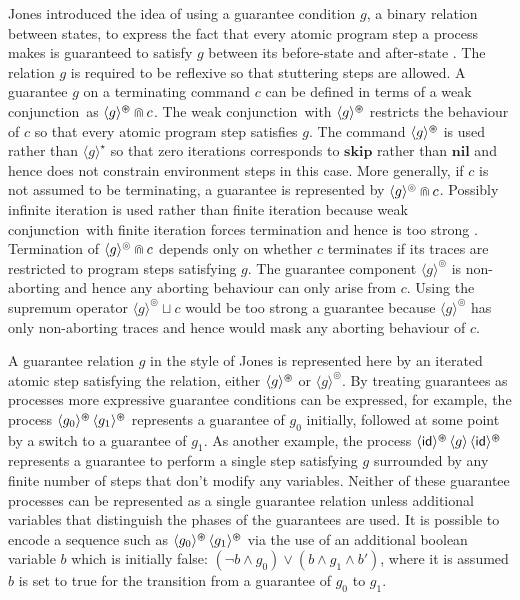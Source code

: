 \documentclass[fleqn]{fac}
\newcommand{\SSeq}{\,}
\newcommand{\atomicrel}[1]{\langle#1\rangle}
\newcommand{\FinSkipIter}{^{\varoast}}
\newcommand{\FinGuar}[1]{\atomicrel{#1}\FinSkipIter}
\newcommand{\omegaskip}{\circledcirc}
\newcommand{\InfSkipIter}{^{\omegaskip}}
\newcommand{\InfGuar}[1]{\atomicrel{#1}\InfSkipIter}
\newcommand{\Nil}{\Keyword{nil}}
\newcommand{\id}{\mathsf{id}}
\newcommand{\angelic}{\mathbin{\sqcup}}
\newcommand{\strictconjunction}{weak conjunction}
\newcommand{\together}{\mathbin{\doublecap}}
\newcommand{\Keyword}[1]{\mathsf{\mathbf{#1}}}
\newcommand{\FinIter}{^{\star}}
\newcommand{\Skip}{\Keyword{skip}}
\begin{document}
Jones introduced the idea of using a guarantee condition $g$, 
a binary relation between states, 
to express the fact that every atomic program step a process makes is guaranteed 
to satisfy $g$ between its before-state and after-state \cite{jon83a}.
The relation $g$ is required to be reflexive so that stuttering steps are allowed.
A guarantee $g$ on a terminating command $c$ can be defined in terms of 
a \strictconjunction\ as $\FinGuar{g} \together c$.
The \strictconjunction\ with $\FinGuar{g}$ restricts the behaviour  of $c$ so that
every atomic program step satisfies $g$.
The command $\FinGuar{g}$ is used rather than $\atomicrel{g}\FinIter$
so that zero iterations corresponds to $\Skip$ rather than $\Nil$
and hence does not constrain environment steps in this case.
More generally, if $c$ is not assumed to be terminating, 
a guarantee is represented by $\InfGuar{g} \together c$.
Possibly infinite iteration is used rather than finite iteration 
because \strictconjunction\ with finite iteration forces termination
and hence is too strong
\cite{HayesJonesColvin14TR}.
Termination of $\InfGuar{g} \together c$ depends only on 
whether $c$ terminates if its traces are restricted to program steps satisfying $g$.
The guarantee component $\InfGuar{g}$ is non-aborting 
and hence any aborting behaviour can only arise from $c$.
Using the supremum operator $\InfGuar{g} \angelic c$
would be too strong a guarantee because $\InfGuar{g}$ has only non-aborting
traces and hence would mask any aborting behaviour of $c$.


A guarantee relation $g$ in the style of Jones is represented here by 
an iterated atomic step satisfying the relation, either $\FinGuar{g}$ or $\InfGuar{g}$.
By treating guarantees as processes more expressive guarantee conditions can
be expressed, for example, the process $\FinGuar{g_0} \SSeq \FinGuar{g_1}$
represents a guarantee of $g_0$ initially, followed at some point by a switch to a guarantee of $g_1$.
As another example, the process $\FinGuar{\id} \SSeq \atomicrel{g} \SSeq \FinGuar{\id}$
represents a guarantee to perform a single step satisfying $g$ surrounded by any finite number of
steps that don't modify any variables.
Neither of these guarantee processes can be represented as a single guarantee relation
unless additional variables that distinguish the phases of the guarantees are used.
It is possible to encode a sequence such as $\FinGuar{g_0} \SSeq \FinGuar{g_1}$
via the use of an additional boolean variable $b$ which is initially false:
$(\lnot b \land g_0) \lor (b \land g_1 \land b')$,
where it is assumed $b$ is set to true for the transition from a guarantee of $g_0$ to $g_1$.
\end{document}
